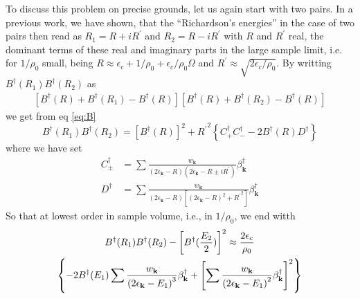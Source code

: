 \documentclass[aps,prb,superscriptaddress,twocolumn]{revtex4}
\newcommand{\vk}{\ensuremath{\mathbf{k}}}
\begin{document}
To discuss this problem on precise grounds, let us again start with two pairs. In
a previous work\cite{combescotBCS}, we have shown, that the ``Richardson's
energies'' in the case of two pairs then read as $R_1=R+iR^{\prime}$ and $R_2=R-i{}R^{\prime}$ with $R$
and $R^{\prime}$ real, the dominant terms of these real and imaginary parts in the
large sample limit, i.e. for $1/\rho_0$ small, being $R\approx\epsilon_c+1/%
\rho_0+\epsilon_c/\rho_0\Omega$ and $R^{\prime}\approx\sqrt{2\epsilon_c/\rho_0}$. By writting $B^{\dagger}(R_1)B^{\dagger}(R_2)$ as 
\begin{multline}
\left[B^{\dagger}(R)+B^{\dagger}(R_1)-B^{\dagger}(R)\right] \left[%
B^{\dagger}(R)+B^{\dagger}(R_2)-B^{\dagger}(R)\right] 
\end{multline}
we get from eq \eqref{eq:B} 
\begin{equation}
B^{\dagger}(R_1)B^{\dagger}(R_2)=\left[B^{\dagger}(R)\right]
^2+{R^{\prime}}^2\left\{C^{\dagger}_+C^{\dagger}_--2B^{\dagger}(R)D^{\dagger}%
\right\} 
\end{equation}
where we have set 
\begin{align}
C^{\dagger}_{\pm}&=\sum\frac{w_\vk}{\left(2\epsilon_\vk-R\right)
\left(2\epsilon_\vk-R\pm{}iR^{\prime}\right) }\beta^{\dagger}_\vk \\
D^{\dagger}&=\sum\frac{w_\vk}{\left(2\epsilon_\vk-R\right) \left[%
\left(2\epsilon_\vk-R\right) ^2+{}{R^{\prime}}^2\right] }\beta^{\dagger}_\vk
\end{align}
So that at lowest order in sample volume, i.e., in $1/\rho_0$, we end witth 
\begin{multline}  \label{eq:BB}
B^{\dagger}(R_1)B^{\dagger}(R_2)-\left[B^{\dagger}(\frac{E _2}{2})%
\right] ^2\approx \frac{2\epsilon_c}{\rho_0} \\
\left\{-2B^{\dagger}(E _1)\sum\frac{w_\vk}{\left(2\epsilon_\vk-%
E _1\right) ^3}\beta^{\dagger}_\vk +\left[\sum\frac{w_\vk}{%
\left(2\epsilon_\vk-E _1\right) ^2}\beta^{\dagger}_\vk\right]
^2\right\}  
\end{multline}
\end{document}
